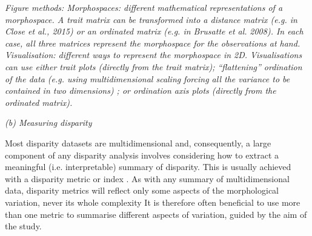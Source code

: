 \documentclass[12pt,letterpaper]{article}
\renewcommand{\subsection}[1]{%
\bigskip
\begin{center}
\begin{large}
\normalfont\itshape #1
\end{large}
\end{center}}
\begin{document}
\textit{Figure methods: Morphospaces: different mathematical representations of a} \emph{morphospace.
A trait matrix can be transformed into a distance matrix (e.g. in Close et al., 2015) or an ordinated matrix (e.g. in Brusatte et al.} \emph{2008).
In each case, all three matrices represent the morphospace for the observations at hand.
Visualisation: different ways to represent the morphospace in 2D.
Visualisations can use either trait plots (directly from the trait matrix); ``flattening'' ordination of the data (e.g. using multidimensional scaling} \emph{forcing all the variance to be contained in two dimensions)
; or ordination axis plots (directly from the ordinated matrix).}

\subsection{(b) Measuring disparity}

Most disparity datasets are multidimensional and, consequently, a large component of any disparity analysis involves considering how to extract a meaningful (i.e. interpretable) summary of disparity.
This is usually achieved with a disparity metric or index \citep{Hopkins2017-cf}.
As with any summary of multidimensional data, disparity metrics will reflect only some aspects of the morphological variation, never its whole complexity %
It is therefore often beneficial to use more than one metric to summarise different aspects of variation, guided by the aim of the study.
\end{document}
